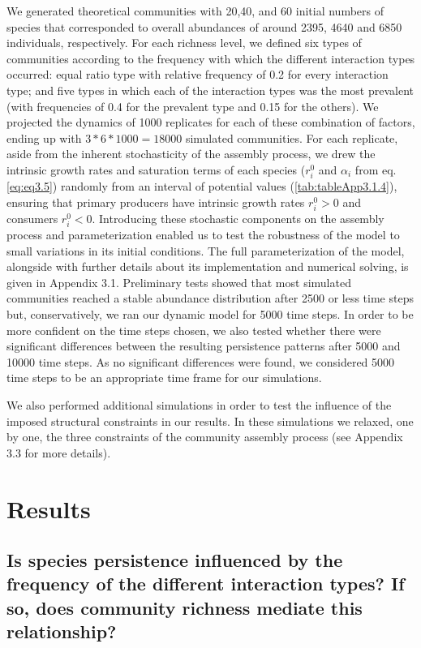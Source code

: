 We generated theoretical communities with 20,40, and 60 initial numbers of species that corresponded to overall abundances of around 2395, 4640 and 6850 individuals, respectively. For each richness level, we defined six types of communities according to the frequency with which the different interaction types occurred: equal ratio type with relative frequency of 0.2 for every interaction type; and five types in which each of the interaction types was the most prevalent (with frequencies of 0.4 for the prevalent type and 0.15 for the others). We projected the dynamics of 1000 replicates for each of these combination of factors, ending up with $3*6*1000 = 18000$ simulated communities. For each replicate, aside from the inherent stochasticity of the assembly process, we drew the intrinsic growth rates and saturation terms of each species ($r_{i}^{0}$ and $\alpha_i$ from eq. \ref{eq:eq3.5}) randomly from an interval of potential values (\cref{tab:tableApp3.1.4}), ensuring that primary producers have intrinsic growth rates $r_{i}^{0} > 0$ and consumers $r_{i}^{0} < 0$. Introducing these stochastic components on the assembly process and parameterization enabled us to test the robustness of the model to small variations in its initial conditions. The full parameterization of the model, alongside with further details about its implementation and numerical solving, is given in Appendix 3.1. Preliminary tests showed that most simulated communities reached a stable abundance distribution after 2500 or less time steps but, conservatively, we ran our dynamic model for 5000 time steps. In order to be more confident on the time steps chosen, we also tested whether there were significant differences between the resulting persistence patterns after 5000 and 10000 time steps. As no significant differences were found, we considered 5000 time steps to be an appropriate time frame for our simulations.

We also performed additional simulations in order to test the influence of the imposed structural constraints in our results. In these simulations we relaxed, one by one, the three constraints of the community assembly process (see Appendix 3.3 for more details).

\section{Results}

\subsection*{Is species persistence influenced by the frequency of the different interaction types? If so, does community richness mediate this relationship? }

